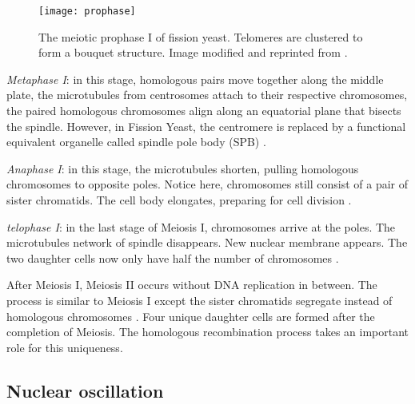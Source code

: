 \begin{figure}[htpb]
    \centering
    \texttt{[image: prophase]}
    \caption{The meiotic prophase I of fission yeast. Telomeres are clustered to form a bouquet structure. Image modified and reprinted from \cite{Asakawa2007}.}
    \label{fig:prophase}
\end{figure}

\emph{Metaphase I}: in this stage, homologous pairs move together along the middle plate, the microtubules from centrosomes attach to their respective chromosomes, the paired homologous chromosomes align along an equatorial plane that bisects the spindle. However, in Fission Yeast, the centromere is replaced by a functional equivalent organelle called spindle pole body (SPB) \cite{Freeman2008}.

\emph{Anaphase I}: in this stage, the microtubules shorten, pulling homologous chromosomes to opposite poles. Notice here, chromosomes still consist of a pair of sister chromatids. The cell body elongates, preparing for cell division \cite{Freeman2008}.

\emph{telophase I}: in the last stage of Meiosis I, chromosomes arrive at the poles. The microtubules network of spindle disappears. New nuclear membrane appears. The two daughter cells now only have half the number of chromosomes \cite{Freeman2008}.

After Meiosis I, Meiosis II occurs without DNA replication in between. The process is similar to Meiosis I except the sister chromatids segregate instead of homologous chromosomes \cite{Freeman2008}. Four unique daughter cells are formed after the completion of Meiosis. The homologous recombination process takes an important role for this uniqueness.

\subsection{Nuclear oscillation}
\label{sub:nuclear_oscillation}

